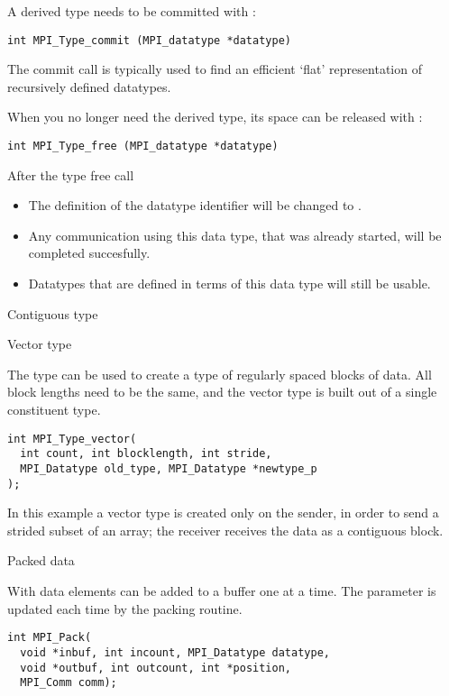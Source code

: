 A derived type needs to be committed with :
\begin{verbatim}
int MPI_Type_commit (MPI_datatype *datatype)
\end{verbatim}
The commit call is typically used to find an efficient `flat' representation
of recursively defined datatypes.

When you no longer need the derived type, its space can be released with
:
\begin{verbatim}
int MPI_Type_free (MPI_datatype *datatype)
\end{verbatim}
After the type free call
\begin{itemize}
\item The definition of the datatype identifier will be changed to
  .
\item Any communication using this data type, that was already
  started, will be completed succesfully.
\item Datatypes that are defined in terms of this data type will still
  be usable.
\end{itemize}

 {Contiguous type}

 {Vector type}

The  type can be used to create a type
of regularly spaced blocks of data. All block lengths need to be the same,
and the vector type is built out of a single constituent type.
\begin{verbatim}
int MPI_Type_vector(
  int count, int blocklength, int stride,
  MPI_Datatype old_type, MPI_Datatype *newtype_p
);
\end{verbatim}

In this example a vector type is created only on the sender, in order to send
a strided subset of an array; the receiver receives the data as a contiguous block.

 {Packed data}

With  data elements can be added 
to a buffer one at a time. The  parameter is updated
each time by the packing routine.
\begin{verbatim}
int MPI_Pack(
  void *inbuf, int incount, MPI_Datatype datatype,
  void *outbuf, int outcount, int *position,
  MPI_Comm comm);
\end{verbatim}

